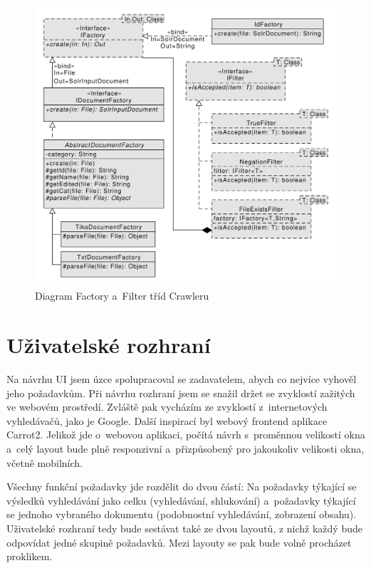 \begin{figure}[h]
\begin{center}
\includegraphics[width=13cm]{OtherClasses}
\caption{Diagram Factory a~Filter tříd Crawleru}
\label{fig:OtherClasses}
\end{center}
\end{figure}

\section{Uživatelské rozhraní}
Na návrhu UI jsem úzce spolupracoval se zadavatelem, abych co nejvíce vyhověl jeho požadavkům. Při návrhu rozhraní jsem se snažil držet se zvyklostí zažitých ve webovém prostředí. Zvláště pak vycházím ze zvyklostí z~internetových vyhledávačů, jako je Google. Další inspirací byl webový frontend aplikace Carrot2. Jelikož jde o~webovou aplikaci, počítá návrh s~proměnnou velikostí okna a~celý layout bude plně responzivní a~přizpůsobený pro jakoukoliv velikosti okna, včetně mobilních.

Všechny funkční požadavky jde rozdělit do dvou částí: Na požadavky týkající se výsledků vyhledávání jako celku (vyhledávání, shlukování) a~požadavky týkající se jednoho vybraného dokumentu (podobnostní vyhledávání, zobrazení obsahu). Uživatelské rozhraní tedy bude sestávat také ze dvou layoutů, z nichž každý bude odpovídat jedné skupině požadavků. Mezi layouty se pak bude volně procházet proklikem. 

